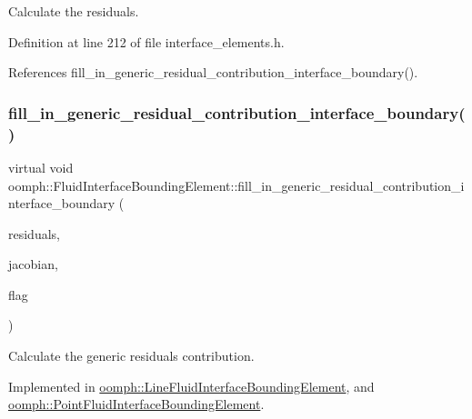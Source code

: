 Calculate the residuals. 



Definition at line 212 of file interface\+\_\+elements.\+h.



References fill\+\_\+in\+\_\+generic\+\_\+residual\+\_\+contribution\+\_\+interface\+\_\+boundary().

\mbox{\label{classoomph_1_1FluidInterfaceBoundingElement_a69fa099e0cbfe8ae028a4edc77fedc60}} 
\subsubsection{\texorpdfstring{fill\+\_\+in\+\_\+generic\+\_\+residual\+\_\+contribution\+\_\+interface\+\_\+boundary()}{fill\_in\_generic\_residual\_contribution\_interface\_boundary()}}
{\footnotesize\ttfamily virtual void oomph\+::\+Fluid\+Interface\+Bounding\+Element\+::fill\+\_\+in\+\_\+generic\+\_\+residual\+\_\+contribution\+\_\+interface\+\_\+boundary (\begin{DoxyParamCaption}\item[{Vector$<$ double $>$ \&}]{residuals,  }\item[{Dense\+Matrix$<$ double $>$ \&}]{jacobian,  }\item[{unsigned}]{flag }\end{DoxyParamCaption})\hspace{0.3cm}{\ttfamily [pure virtual]}}



Calculate the generic residuals contribution. 



Implemented in \hyperlink{classoomph_1_1LineFluidInterfaceBoundingElement_aa162a09ba8dfcba4d81e6abaa7a29986}{oomph\+::\+Line\+Fluid\+Interface\+Bounding\+Element}, and \hyperlink{classoomph_1_1PointFluidInterfaceBoundingElement_aad95a7d6f4e4349ee1136e623aa69c88}{oomph\+::\+Point\+Fluid\+Interface\+Bounding\+Element}.



